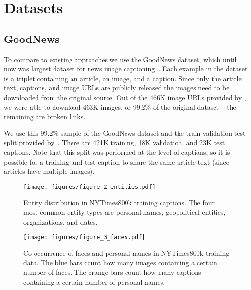 \section{Datasets}

\subsection{GoodNews}

To compare to existing approaches we use the GoodNews dataset, which until now
was largest
dataset for news image captioning~\cite{Biten2019GoodNews}. Each example in the
dataset is a triplet containing an article, an image, and a caption. Since only
the article text, captions, and image URLs are publicly released
the images need to be downloaded from the original source. Out of the 466K
image
URLs provided by
\cite{Biten2019GoodNews}, we were able to download 463K images, or 99.2\% of the
original dataset -- the remaining are broken links.

We use this 99.2\% sample of the GoodNews dataset and the
train-validation-test split provided by~\cite{Biten2019GoodNews}. There are
421K training, 18K validation, and 23K test captions. Note that
this split was performed at the level of captions, so it is possible for a
training and test
caption to share the same article text (since articles have multiple images).





\begin{figure}[t]
   \begin{center}
   \texttt{[image: figures/figure\_2\_entities.pdf]}
   \end{center}
      \caption{Entity distribution in NYTimes800k training captions. The four
               most common entity types are personal names, geopolitical
               entities, organizations, and dates.}
   \label{fig:entities}
\end{figure}

\begin{figure}[t]
   \begin{center}
   \texttt{[image: figures/figure\_3\_faces.pdf]}
   \end{center}
      \caption{Co-occurrence of faces and personal names in NYTimes800k
               training data. The blue bars count how many images containing a
               certain number of faces. The orange bars count how many captions
               containing a certain number of personal names.}
   \label{fig:faces}
\end{figure}


